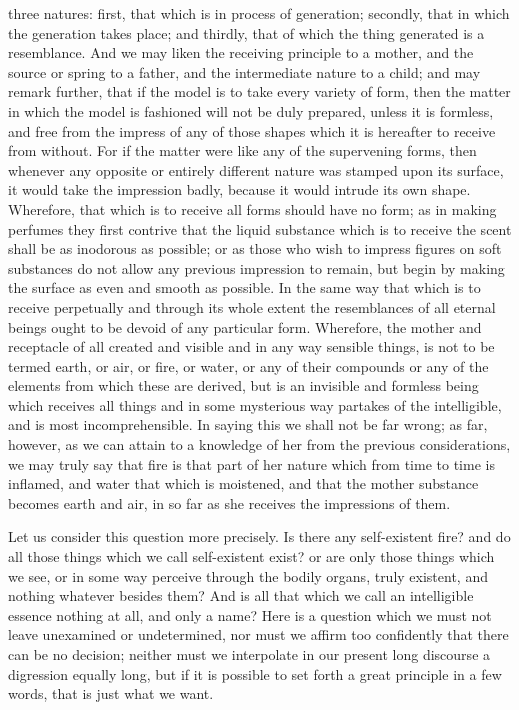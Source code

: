 \documentclass[11pt,letter]{article}
\begin{document}
three natures: first, that which is in process of generation; secondly, that in which the generation takes place; and thirdly, that of which the thing generated is a resemblance. And we may liken the receiving principle to a mother, and the source or spring to a father, and the intermediate nature to a child; and may remark further, that if the model is to take every variety of form, then the matter in which the model is fashioned will not be duly prepared, unless it is formless, and free from the impress of any of those shapes which it is hereafter to receive from without. For if the matter were like any of the supervening forms, then whenever any opposite or entirely different nature was stamped upon its surface, it would take the impression badly, because it would intrude its own shape. Wherefore, that which is to receive all forms should have no form; as in making perfumes they first contrive that the liquid substance which is to receive the scent shall be as inodorous as possible; or as those who wish to impress figures on soft substances do not allow any previous impression to remain, but begin by making the surface as even and smooth as possible. In the same way that which is to receive perpetually and through its whole extent the resemblances of all eternal beings ought to be devoid of any particular form. Wherefore, the mother and receptacle of all created and visible and in any way sensible things, is not to be termed earth, or air, or fire, or water, or any of their compounds or any of the elements from which these are derived, but is an invisible and formless being which receives all things and in some mysterious way partakes of the intelligible, and is most incomprehensible. In saying this we shall not be far wrong; as far, however, as we can attain to a knowledge of her from the previous considerations, we may truly say that fire is that part of her nature which from time to time is inflamed, and water that which is moistened, and that the mother substance becomes earth and air, in so far as she receives the impressions of them.

\par  Let us consider this question more precisely. Is there any self-existent fire? and do all those things which we call self-existent exist? or are only those things which we see, or in some way perceive through the bodily organs, truly existent, and nothing whatever besides them? And is all that which we call an intelligible essence nothing at all, and only a name? Here is a question which we must not leave unexamined or undetermined, nor must we affirm too confidently that there can be no decision; neither must we interpolate in our present long discourse a digression equally long, but if it is possible to set forth a great principle in a few words, that is just what we want.
\end{document}

